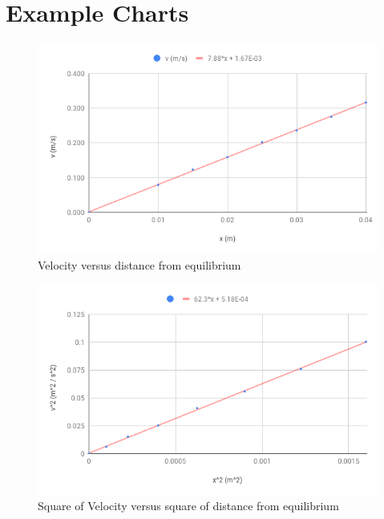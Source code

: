 \section{Example Charts}
%
\begin{figure}[ht]
    \centering
    \includegraphics[scale=0.71]{image/06-kinetic/v.png}
    \caption{Velocity versus distance from equilibrium}
    \label{figure:06.v}
\end{figure}
%
\begin{figure}[ht]
    \centering
    \includegraphics[scale=0.71]{image/06-kinetic/v2.png}
    \caption{Square of Velocity versus square of distance from equilibrium}
    \label{figure:06.v.2}
\end{figure}
%